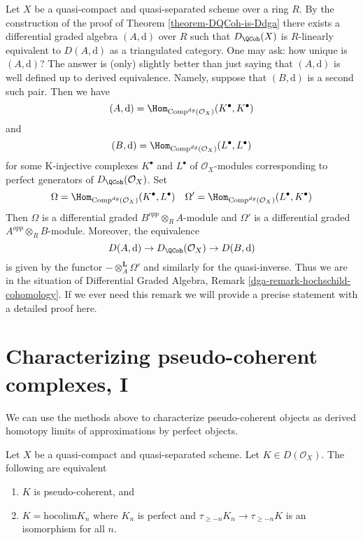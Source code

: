 \begin{remark}
\label{remark-independence-choice}
Let $X$ be a quasi-compact and quasi-separated scheme over a ring $R$.
By the construction of the proof of
Theorem \ref{theorem-DQCoh-is-Ddga}
there exists a differential graded algebra $(A, \text{d})$ over $R$
such that $D_\QCoh(X)$ is $R$-linearly equivalent to
$D(A, \text{d})$ as a triangulated category.
One may ask: how unique is $(A, \text{d})$?
The answer is (only) slightly better than just saying that
$(A, \text{d})$ is well defined up to derived equivalence.
Namely, suppose that $(B, \text{d})$ is a second such pair.
Then we have
$$
(A, \text{d}) = \Hom_{\text{Comp}^{dg}(\mathcal{O}_X)}(K^\bullet, K^\bullet)
$$
and
$$
(B, \text{d}) = \Hom_{\text{Comp}^{dg}(\mathcal{O}_X)}(L^\bullet, L^\bullet)
$$
for some K-injective complexes $K^\bullet$ and $L^\bullet$
of $\mathcal{O}_X$-modules corresponding to perfect generators
of $D_\QCoh(\mathcal{O}_X)$. Set
$$
\Omega = \Hom_{\text{Comp}^{dg}(\mathcal{O}_X)}(K^\bullet, L^\bullet)
\quad
\Omega' = \Hom_{\text{Comp}^{dg}(\mathcal{O}_X)}(L^\bullet, K^\bullet)
$$
Then $\Omega$ is a differential graded $B^{opp} \otimes_R A$-module
and $\Omega'$ is a differential graded $A^{opp} \otimes_R B$-module.
Moreover, the equivalence
$$
D(A, \text{d}) \to D_\QCoh(\mathcal{O}_X) \to
D(B, \text{d})
$$
is given by the functor $- \otimes_A^\mathbf{L} \Omega'$ and
similarly for the quasi-inverse. Thus we are in the situation
of Differential Graded Algebra, Remark \ref{dga-remark-hochschild-cohomology}.
If we ever need this remark we will provide a precise statement
with a detailed proof here.
\end{remark}






\section{Characterizing pseudo-coherent complexes, I}
\label{section-pseudo-coherent-hocolim}

\noindent
We can use the methods above to characterize pseudo-coherent
objects as derived homotopy limits of approximations by perfect objects.

\begin{lemma}
\label{lemma-pseudo-coherent-hocolim}
Let $X$ be a quasi-compact and quasi-separated scheme.
Let $K \in D(\mathcal{O}_X)$. The following are equivalent
\begin{enumerate}
\item $K$ is pseudo-coherent, and
\item $K = \text{hocolim} K_n$ where
$K_n$ is perfect and $\tau_{\geq -n}K_n \to \tau_{\geq -n}K$
is an isomorphism for all $n$.
\end{enumerate}
\end{lemma}

